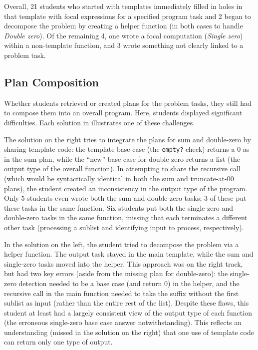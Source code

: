 \documentclass{sig-alternate-05-2015}
\begin{document}
Overall, 21 students who started with templates immediately filled in holes in that template with focal expressions for a specified program task and 2 began to decompose the problem by creating a helper function (in both cases to handle \textit{Double zero}). Of the remaining 4, one wrote a focal computation (\textit{Single zero}) within a non-template function, and 3 wrote something not clearly linked to a problem task. 

\subsection{Plan Composition}

Whether students retrieved or created plans for the problem tasks, they still had to compose them into an overall program. Here, students displayed significant difficulties.  Each solution in  illustrates one of these challenges.

The solution on the right tries to integrate the plans for sum and double-zero by sharing template code: the template base-case (the \lstinline{empty?} check) returns a 0 as in the sum plan, while the ``new'' base case for double-zero returns a list (the output type of the overall function).  In attempting to share the recursive call (which would be syntactically identical in both the sum and truncate-at-00 plans), the student created an inconsistency in the output type of the program. Only 5 students even wrote both the sum and double-zero tasks; 3 of these put these tasks in the same function. Six students put both the single-zero and double-zero tasks in the same function, missing that each terminates a different other task (processing a sublist and identifying input to process, respectively).

In the solution on the left, the student tried to decompose the problem via a helper function.  The output task stayed in the main template, while the sum and single-zero tasks moved into the helper. This approach was on the right track, but had two key errors (aside from the missing plan for double-zero): the single-zero detection needed to be a base case (and return 0) in the helper, and the recursive call in the main function needed to take the suffix without the first sublist as input (rather than the entire rest of the list).  Despite these flaws, this student at least had a largely consistent view of the output type of each function (the erroneous single-zero base case answer notwithstanding). This reflects an understanding (missed in the solution on the right) that one use of template code can return only one type of output.
\end{document}
